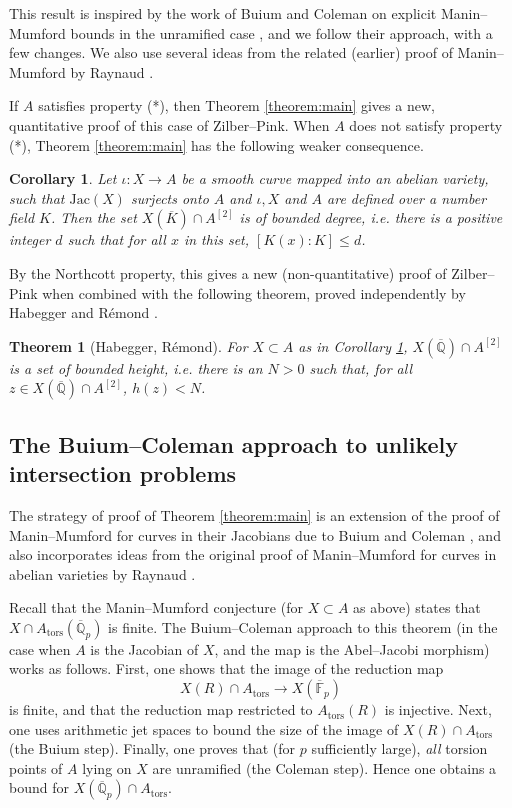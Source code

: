 \documentclass[11pt]{amsart}
\def\Q{\mathbb Q}
\newcommand{\tors}{\mathrm{tors}}
\theoremstyle{plain}
\newtheorem{theorem}{Theorem}
\newtheorem{corollary}{Corollary}
\theoremstyle{definition}
\newcommand{\F}{\mathbb{F}}
\newcommand{\Jac}{\mathrm{Jac}}
\begin{document}
This result is inspired by the work of Buium and Coleman on explicit Manin--Mumford bounds in the unramified case \cite{buium:96} \cite{coleman:ramified}, and we follow their approach, with a few changes. We also use several ideas from the related (earlier) proof of Manin--Mumford by Raynaud \cite{raynaud}.

If $A$ satisfies property (*), then Theorem \ref{theorem:main} gives a new, quantitative proof of this case of Zilber--Pink. When $A$ does not satisfy property (*), Theorem \ref{theorem:main} has the following weaker consequence.
\begin{corollary}\label{cor:deg}
Let $\iota :X\to A$ be a smooth curve mapped into an abelian variety, such that $\Jac (X)$ surjects onto $A$ and $\iota ,X$ and $A$ are defined over a number field $K$. Then the set $X(\overline{K})\cap A^{[2]}$ is of bounded degree, i.e. there is a positive integer $d$ such that for all $x$ in this set, $[K(x):K]\leq d$.
\end{corollary}
By the Northcott property, this gives a new (non-quantitative) proof of Zilber--Pink when combined with the following theorem, proved independently by Habegger and R\'emond \cite{Hab} \cite{rem1}.
\begin{theorem}[Habegger, R\'emond]
For $X\subset A$ as in Corollary \ref{cor:deg}, $X(\overline{\Q })\cap A^{[2]}$ is a set of bounded height, i.e. there is an $N>0$ such that, for all $z\in X(\overline{\Q })\cap A^{[2]}$, $h(z)<N$.
\end{theorem}

\subsection{The Buium--Coleman approach to unlikely intersection problems}
The strategy of proof of Theorem \ref{theorem:main} is an extension of the proof of Manin--Mumford for curves in their Jacobians due to Buium and Coleman \cite{buium:96} \cite{coleman:ramified}, and also incorporates ideas from the original proof of Manin--Mumford for curves in abelian varieties by Raynaud \cite{raynaud}.

Recall that the Manin--Mumford conjecture (for $X\subset A$ as above) states that $X\cap A_{\tors }(\overline{\Q }_p )$ is finite. The Buium--Coleman approach to this theorem (in the case when $A$ is the Jacobian of $X$, and the map is the Abel--Jacobi morphism) works as follows. First, one shows that the image of the reduction map
\[
X(R)\cap A_{\tors }\to X(\overline{\F }_p )
\]
is finite, and that the reduction map restricted to $A_{\tors}(R)$ is injective. Next, one uses arithmetic jet spaces to bound the size of the image of $X(R)\cap A_{\tors }$ (the Buium step). Finally, one proves that (for $p$ sufficiently large), \textit{all} torsion points of $A$ lying on $X$ are unramified (the Coleman step). Hence one obtains a bound for $X(\overline{\Q }_p )\cap A_{\tors }$.
\end{document}
